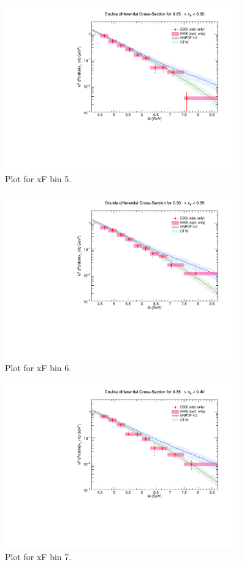 \begin{figure}[p]
\centering
\includegraphics[width=0.9\textwidth]{./XSecPlots/LH2_5_roofit.pdf}
\caption{Plot for xF bin 5.}
\end{figure}
\clearpage

\begin{figure}[p]
\centering
\includegraphics[width=0.9\textwidth]{./XSecPlots/LH2_6_roofit.pdf}
\caption{Plot for xF bin 6.}
\end{figure}
\clearpage

\begin{figure}[p]
\centering
\includegraphics[width=0.9\textwidth]{./XSecPlots/LH2_7_roofit.pdf}
\caption{Plot for xF bin 7.}
\end{figure}
\clearpage

